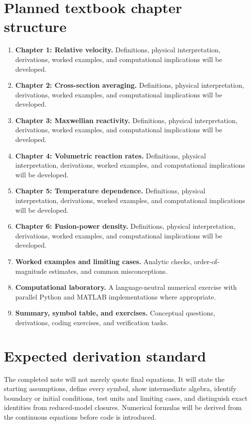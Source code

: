 \documentclass[11pt]{article}
\begin{document}
\section{Planned textbook chapter structure}
\begin{enumerate}[leftmargin=1.8em]
\item \textbf{Chapter 1: Relative velocity.} Definitions, physical interpretation, derivations, worked examples, and computational implications will be developed.
\item \textbf{Chapter 2: Cross-section averaging.} Definitions, physical interpretation, derivations, worked examples, and computational implications will be developed.
\item \textbf{Chapter 3: Maxwellian reactivity.} Definitions, physical interpretation, derivations, worked examples, and computational implications will be developed.
\item \textbf{Chapter 4: Volumetric reaction rates.} Definitions, physical interpretation, derivations, worked examples, and computational implications will be developed.
\item \textbf{Chapter 5: Temperature dependence.} Definitions, physical interpretation, derivations, worked examples, and computational implications will be developed.
\item \textbf{Chapter 6: Fusion-power density.} Definitions, physical interpretation, derivations, worked examples, and computational implications will be developed.
\item \textbf{Worked examples and limiting cases.} Analytic checks, order-of-magnitude estimates, and common misconceptions.
\item \textbf{Computational laboratory.} A language-neutral numerical exercise with parallel Python and MATLAB implementations where appropriate.
\item \textbf{Summary, symbol table, and exercises.} Conceptual questions, derivations, coding exercises, and verification tasks.
\end{enumerate}

\section{Expected derivation standard}
The completed note will not merely quote final equations. It will state the starting assumptions, define every symbol, show intermediate algebra, identify boundary or initial conditions, test units and limiting cases, and distinguish exact identities from reduced-model closures. Numerical formulas will be derived from the continuous equations before code is introduced.
\end{document}
